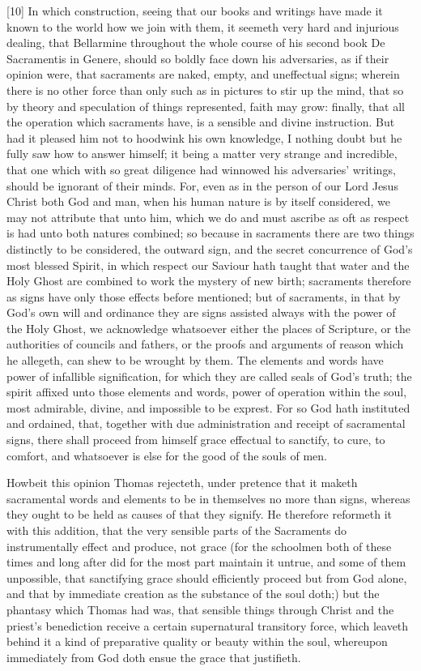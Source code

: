 [10] In which construction, seeing that our books and writings have made it known to the world how we join with them, it seemeth very hard and injurious dealing, that Bellarmine throughout the whole course of his second book De Sacramentis in Genere, should so boldly face down his adversaries, as if their opinion were, that sacraments are naked, empty, and uneffectual signs; wherein there is no other force than only such as in pictures to stir up the mind, that so by theory and speculation of things represented, faith may grow: finally, that all the operation which sacraments  have, is a sensible and divine instruction. But had it pleased him not to hoodwink his own knowledge, I nothing doubt but he fully saw how to answer himself; it being a matter very strange and incredible, that one which with so great diligence had winnowed his adversaries’ writings, should be ignorant of their minds. For, even as in the person of our Lord Jesus Christ both God and man, when his human nature is by itself considered, we may not attribute that unto him, which we do and must ascribe as oft as respect is had unto both natures combined; so because in sacraments there are two things distinctly to be considered, the outward sign, and the secret concurrence of God’s most blessed Spirit, in which respect our Saviour hath taught that water and the Holy Ghost are combined to work the mystery of new birth; sacraments therefore as signs have only those effects before mentioned; but of sacraments, in that by God’s own will and ordinance they are signs assisted always with the power of the Holy Ghost, we acknowledge whatsoever either the places of Scripture, or the authorities of councils and fathers, or the proofs and arguments of reason which he allegeth, can shew to be wrought by them. The elements and words have power of infallible signification, for which they are called seals of God’s truth; the spirit affixed unto those elements and words, power of operation within the soul, most admirable, divine, and impossible to be exprest. For so God hath instituted and ordained, that, together with due administration and receipt of sacramental signs, there shall proceed from himself grace effectual to sanctify, to cure, to comfort, and whatsoever is else for the good of the souls of men.

Howbeit this opinion Thomas rejecteth, under pretence that it maketh sacramental words and elements to be in themselves no more than signs, whereas they ought to be held as causes of that they signify. He therefore reformeth  it with this addition, that the very sensible parts of the Sacraments do instrumentally effect and produce, not grace (for the schoolmen both of these times and long after did for the most part maintain it untrue, and some of them unpossible, that sanctifying grace should efficiently proceed but from God alone, and that by immediate creation as the substance of the soul doth;) but the phantasy which Thomas had was, that sensible things through Christ and the priest’s benediction receive a certain supernatural transitory force, which leaveth behind it a kind of preparative quality or beauty within the soul, whereupon immediately from God doth ensue the grace that justifieth.

